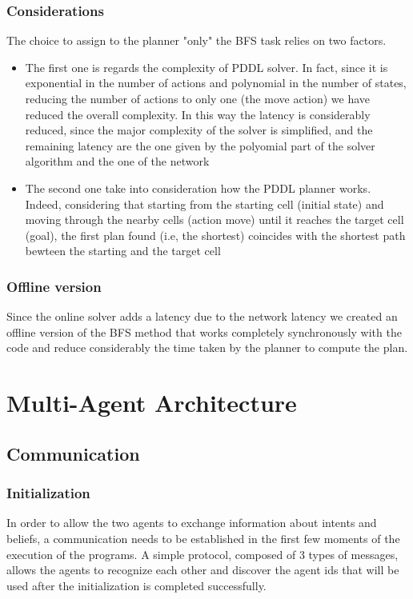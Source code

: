 \documentclass[a4paper, 11pt]{article}
\begin{document}
\subsubsection{Considerations}

The choice to assign to the planner "only" the BFS task relies on two factors.
\begin{itemize}
    \item The first one is regards the complexity of PDDL solver. In fact, since it is exponential in the number of actions and polynomial in the number of states, reducing the number of actions to only one (the move action) we have reduced the overall complexity. In this way the latency is considerably reduced, since the major complexity of the solver is simplified, and the remaining latency are the one given by the polyomial part of the solver algorithm and the one of the network
    \item The second one take into consideration how the PDDL planner works. Indeed, considering that starting from the starting cell (initial state) and moving through the nearby cells (action move) until it reaches the target cell (goal), the first plan found (i.e, the shortest) coincides with the shortest path bewteen the starting and the target cell
\end{itemize}

\subsubsection{Offline version}

Since the online solver adds a latency due to the network latency we created an offline version of the BFS method that works completely synchronously with the code and reduce considerably the time taken by the planner to compute the plan.


\section{Multi-Agent Architecture}

\subsection{Communication}
\subsubsection{Initialization}
In order to allow the two agents to exchange information about intents and beliefs, a communication needs to be established in the first few moments of the execution of the programs. A simple protocol, composed of 3 types of messages, allows the agents to recognize each other and discover the agent ids that will be used after the initialization is completed successfully.
\end{document}
